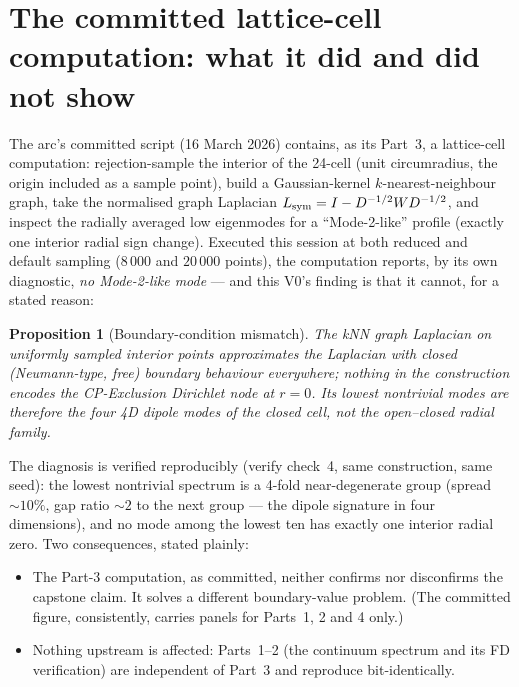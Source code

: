 \documentclass[12pt]{article}
\newtheorem{proposition}{Proposition}
\begin{document}
\section{The committed lattice-cell computation: what it did and did
not show}
\label{sec:instrument}

The arc's committed script (16 March 2026) contains, as its Part~3, a
lattice-cell computation: rejection-sample the interior of the 24-cell
(unit circumradius, the origin included as a sample point), build a
Gaussian-kernel $k$-nearest-neighbour graph, take the normalised graph
Laplacian $L_{\rm sym} = I - D^{-1/2}WD^{-1/2}$, and inspect the
radially averaged low eigenmodes for a ``Mode-2-like'' profile (exactly
one interior radial sign change).  Executed this session at both
reduced and default sampling ($8\,000$ and $20\,000$ points), the
computation reports, by its own diagnostic, \emph{no Mode-2-like mode}
--- and this V0's finding is that it cannot, for a stated reason:

\begin{proposition}[Boundary-condition mismatch]
The kNN graph Laplacian on uniformly sampled interior points
approximates the Laplacian with \emph{closed} (Neumann-type, free)
boundary behaviour everywhere; nothing in the construction encodes the
CP-Exclusion Dirichlet node at $r = 0$.  Its lowest nontrivial modes
are therefore the four 4D dipole modes of the closed cell, not the
open--closed radial family.
\end{proposition}

\noindent The diagnosis is verified reproducibly (verify check~4, same
construction, same seed): the lowest nontrivial spectrum is a 4-fold
near-degenerate group (spread $\sim10\%$, gap ratio $\sim2$ to the next
group --- the dipole signature in four dimensions), and no mode among
the lowest ten has exactly one interior radial zero.  Two consequences,
stated plainly:
\begin{itemize}[leftmargin=2em]
\item The Part-3 computation, as committed, neither confirms nor
disconfirms the capstone claim.  It solves a different boundary-value
problem.  (The committed figure, consistently, carries panels for
Parts~1, 2 and 4 only.)
\item Nothing upstream is affected: Parts~1--2 (the continuum spectrum
and its FD verification) are independent of Part~3 and reproduce
bit-identically.
\end{itemize}
\end{document}
